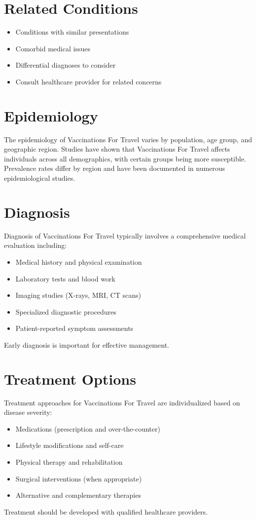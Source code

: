\section*{Related Conditions}
\begin{itemize}
  \item Conditions with similar presentations
  \item Comorbid medical issues
  \item Differential diagnoses to consider
  \item Consult healthcare provider for related concerns
\end{itemize}

\section*{Epidemiology}
The epidemiology of Vaccinations For Travel varies by population, age group, and geographic region. Studies have shown that Vaccinations For Travel affects individuals across all demographics, with certain groups being more susceptible. Prevalence rates differ by region and have been documented in numerous epidemiological studies.

\section*{Diagnosis}
Diagnosis of Vaccinations For Travel typically involves a comprehensive medical evaluation including:
\begin{itemize}
  \item Medical history and physical examination
  \item Laboratory tests and blood work
  \item Imaging studies (X-rays, MRI, CT scans)
  \item Specialized diagnostic procedures
  \item Patient-reported symptom assessments
\end{itemize}
Early diagnosis is important for effective management.

\section*{Treatment Options}
Treatment approaches for Vaccinations For Travel are individualized based on disease severity:
\begin{itemize}
  \item Medications (prescription and over-the-counter)
  \item Lifestyle modifications and self-care
  \item Physical therapy and rehabilitation
  \item Surgical interventions (when appropriate)
  \item Alternative and complementary therapies
\end{itemize}
Treatment should be developed with qualified healthcare providers.

